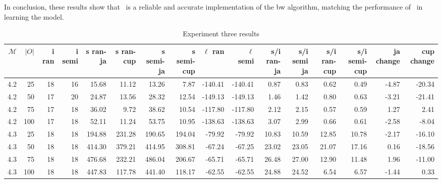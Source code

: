 In conclusion, these results show that \Cupaal\ is a reliable and accurate implementation of the \gls{bw} algorithm, matching the performance of \Jajapy\ in learning the model.


\begin{table*}
    \caption{Experiment three results}
    \label{tab:experiment3-table}
    \begin{tabular}{rrrrrrrrrrrrrrrr}
        \toprule
        $\mathcal{M}$ & $|O|$ & i ran & i semi & s ran-ja & s ran-cup & s semi-ja & s semi-cup & $\ell$ ran & $\ell$ semi & s/i ran-ja & s/i semi ja & s/i ran-cup & s/i semi-cup & ja change & cup change \\
        \midrule
        4.2           & 25    & 18    & 16     & 15.68    & 11.12     & 13.26     & 7.87       & -140.41    & -140.41     & 0.87       & 0.83        & 0.62        & 0.49         & -4.87     & -20.34     \\
        4.2           & 50    & 17    & 20     & 24.87    & 13.56     & 28.32     & 12.54      & -149.13    & -149.13     & 1.46       & 1.42        & 0.80        & 0.63         & -3.21     & -21.41     \\
        4.2           & 75    & 17    & 18     & 36.02    & 9.72      & 38.62     & 10.54      & -117.80    & -117.80     & 2.12       & 2.15        & 0.57        & 0.59         & 1.27      & 2.41       \\
        4.2           & 100   & 17    & 18     & 52.11    & 11.24     & 53.75     & 10.95      & -138.63    & -138.63     & 3.07       & 2.99        & 0.66        & 0.61         & -2.58     & -8.04      \\
        4.3           & 25    & 18    & 18     & 194.88   & 231.28    & 190.65    & 194.04     & -79.92     & -79.92      & 10.83      & 10.59       & 12.85       & 10.78        & -2.17     & -16.10     \\
        4.3           & 50    & 18    & 18     & 414.30   & 379.21    & 414.95    & 308.81     & -67.24     & -67.25      & 23.02      & 23.05       & 21.07       & 17.16        & 0.16      & -18.56     \\
        4.3           & 75    & 18    & 18     & 476.68   & 232.21    & 486.04    & 206.67     & -65.71     & -65.71      & 26.48      & 27.00       & 12.90       & 11.48        & 1.96      & -11.00     \\
        4.3           & 100   & 18    & 18     & 447.83   & 117.78    & 441.40    & 118.17     & -62.55     & -62.55      & 24.88      & 24.52       & 6.54        & 6.57         & -1.44     & 0.33       \\

\end{tabular}
\end{table*}
